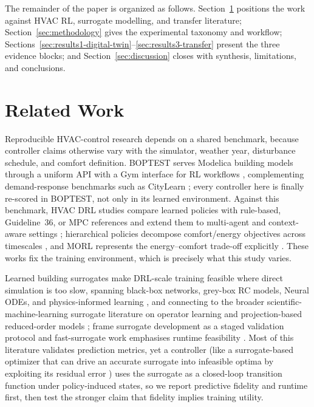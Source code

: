 The remainder of the paper is organized as follows. Section~\ref{sec:related} positions the work against HVAC RL, surrogate modelling, and transfer literature; Section~\ref{sec:methodology} gives the experimental taxonomy and workflow; Sections~\ref{sec:results1-digital-twin}--\ref{sec:results3-transfer} present the three evidence blocks; and Section~\ref{sec:discussion} closes with synthesis, limitations, and conclusions.

\section{Related Work}\label{sec:related}
Reproducible HVAC-control research depends on a shared benchmark, because controller claims otherwise vary with the simulator, weather year, disturbance schedule, and comfort definition. BOPTEST serves Modelica building models through a uniform API \citep{Blum2021BOPTEST,Wetter2014Modelica} with a Gym interface for RL workflows \citep{Arroyo2021GymBOPTEST}, complementing demand-response benchmarks such as CityLearn \citep{VazquezCanteli2019CityLearn,VazquezCanteli2019Review}; every controller here is finally re-scored in BOPTEST, not only in its learned environment. Against this benchmark, HVAC DRL studies compare learned policies with rule-based, Guideline~36, or MPC references \citep{Savino2025ASHRAE,Wang2025SafeDRL,Nguyen2024Modelling,Sun2024DirectTSup} and extend them to multi-agent and context-aware settings \citep{Deng2025MultiAgent,Alotaibi2025ContextAware}; hierarchical policies decompose comfort/energy objectives across timescales \citep{Liao2025HDRL,Bacon2017Options,Nachum2018HIRO}, and MORL represents the energy--comfort trade-off explicitly \citep{Yang2019MORL,Roijers2013MOSurvey,Hayes2022MOSurvey,Byeon2025MaxMinMORL}. These works fix the training environment, which is precisely what this study varies.

Learned building surrogates make DRL-scale training feasible where direct simulation is too slow, spanning black-box networks, grey-box RC models, Neural ODEs, and physics-informed learning \citep{Bacher2011RCIdentification,Berthou2014RC,Bunning2020RC,Picard2017WhiteBox,Raissi2019PINN,Chen2018NeuralODE,Karpatne2017TheoryGuided,Willard2022PIML,Hedayat2025PINN}, and connecting to the broader scientific-machine-learning surrogate literature on operator learning and projection-based reduced-order models \citep{Lu2021DeepONet,Li2021FNO,Benner2015ROM}; \citet{HouEvins2024} frame surrogate development as a staged validation protocol and fast-surrogate work emphasises runtime feasibility \citep{Mshragi2026FastML}. Most of this literature validates prediction metrics, yet a controller (like a surrogate-based optimizer that can drive an accurate surrogate into infeasible optima by exploiting its residual error \citep{Jones1998EGO}) uses the surrogate as a closed-loop transition function under policy-induced states, so we report predictive fidelity and runtime first, then test the stronger claim that fidelity implies training utility.

